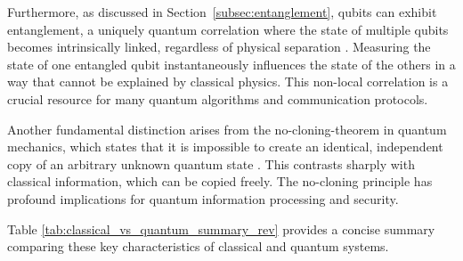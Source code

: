\begin{sloppypar}
Furthermore, as discussed in Section~\ref{subsec:entanglement}, \glspl{qubit} can exhibit \gls{entanglement}, a uniquely quantum correlation where the state of multiple \glspl{qubit} becomes intrinsically linked, regardless of physical separation \parencite{nielsen_chuang_book}. Measuring the state of one entangled \gls{qubit} instantaneously influences the state of the others in a way that cannot be explained by classical physics. This non-local correlation is a crucial resource for many quantum algorithms and communication protocols.

Another fundamental distinction arises from the \gls{no-cloning-theorem} in quantum mechanics, which states that it is impossible to create an identical, independent copy of an arbitrary unknown quantum state \parencite{nielsen_chuang_book}. This contrasts sharply with classical information, which can be copied freely. The no-cloning principle has profound implications for quantum information processing and security. %
\end{sloppypar}

Table \ref{tab:classical_vs_quantum_summary_rev} provides a concise summary comparing these key characteristics of classical and quantum systems.

